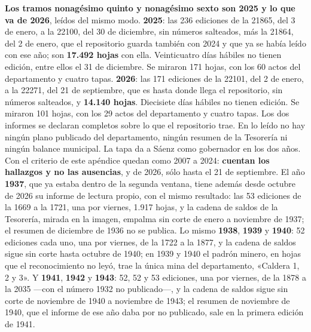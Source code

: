 \textbf{Los tramos nonagésimo quinto y nonagésimo sexto son 2025 y lo que va de 2026}, leídos del mismo modo. \textbf{2025}: las 236 ediciones de la 21865, del 3 de enero, a la 22100, del 30 de diciembre, sin números salteados, más la 21864, del 2 de enero, que el repositorio guarda también con 2024 y que ya se había leído con ese año; son \textbf{17.492 hojas} con ella. Veinticuatro días hábiles no tienen edición, entre ellos el 31 de diciembre. Se miraron 171 hojas, con los 60 actos del departamento y cuatro tapas. \textbf{2026}: las 171 ediciones de la 22101, del 2 de enero, a la 22271, del 21 de septiembre, que es hasta donde llega el repositorio, sin números salteados, y \textbf{14.140 hojas}. Diecisiete días hábiles no tienen edición. Se miraron 101 hojas, con los 29 actos del departamento y cuatro tapas. Los dos informes se declaran completos sobre lo que el repositorio trae. En lo leído no hay ningún plano publicado del departamento, ningún resumen de la Tesorería ni ningún balance municipal. La tapa da a Sáenz como gobernador en los dos años. Con el criterio de este apéndice quedan como 2007 a 2024: \textbf{cuentan los hallazgos y no las ausencias}, y de 2026, sólo hasta el 21 de septiembre. El año \textbf{1937}, que ya estaba dentro de la segunda ventana, tiene además desde octubre de 2026 su informe de lectura propio, con el mismo resultado: las 53 ediciones de la 1669 a la 1721, una por viernes, 1.917 hojas, y la cadena de saldos de la Tesorería, mirada en la imagen, empalma sin corte de enero a noviembre de 1937; el resumen de diciembre de 1936 no se publica. Lo mismo \textbf{1938}, \textbf{1939} y \textbf{1940}: 52 ediciones cada uno, una por viernes, de la 1722 a la 1877, y la cadena de saldos sigue sin corte hasta octubre de 1940; en 1939 y 1940 el padrón minero, en hojas que el reconocimiento no leyó, trae la única mina del departamento, «Caldera 1, 2 y 3». Y \textbf{1941}, \textbf{1942} y \textbf{1943}: 52, 52 y 53 ediciones, una por viernes, de la 1878 a la 2035 ---con el número 1932 no publicado---, y la cadena de saldos sigue sin corte de noviembre de 1940 a noviembre de 1943; el resumen de noviembre de 1940, que el informe de ese año daba por no publicado, sale en la primera edición de 1941.


